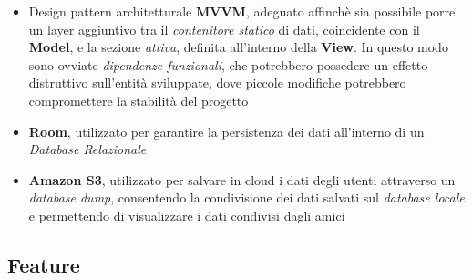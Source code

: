 \documentclass{article}
\begin{document}
\begin{itemize}
    \renewcommand{\labelitemi}{-}
    \item Design pattern architetturale \textbf{MVVM}, adeguato affinchè sia possibile porre un layer aggiuntivo tra il \textit{contenitore statico} di dati, coincidente con il \textbf{Model}, e la sezione \textit{attiva}, definita all'interno della \textbf{View}. In questo modo sono ovviate \textit{dipendenze funzionali}, che potrebbero possedere un effetto distruttivo sull'entità sviluppate, dove piccole modifiche potrebbero compromettere la stabilità del progetto 
    \item \textbf{Room}, utilizzato per garantire la persistenza dei dati all'interno di un \textit{Database Relazionale}
    \item \textbf{Amazon S3}, utilizzato per salvare in cloud i dati degli utenti attraverso un \textit{database dump}, consentendo la condivisione dei dati salvati sul \textit{database locale} e permettendo di visualizzare i dati condivisi dagli amici
\end{itemize}

\newpage
\subsection*{Feature}
\end{document}
